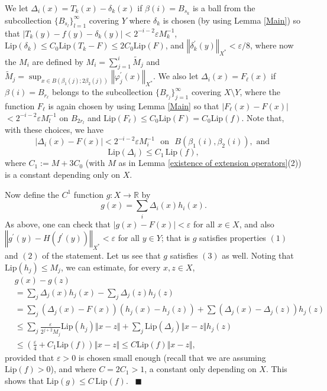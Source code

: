 \documentclass[11pt]{amsproc}%
\theoremstyle{plain}
\numberwithin{equation}{section}
\begin{document}
\noindent We let $\Delta_{i}\left(  x\right)  =T_{k}\left(  x\right)
-\delta_{k}\left(  x\right)  $ if $\beta(i)=B_{s_{k}}$ is a ball from the
subcollection $\{B_{s_{l}}\}_{l=1}^{\infty}$ covering $Y$ where $\delta_{k}$
is chosen (by using Lemma \ref{Main}) so that $\left\vert T_{k}\left(
y\right)  -f\left(  y\right)  -\delta_{k}\left(  y\right)  \right\vert
<2^{-i-2}\varepsilon M_{k}^{-1}$, $\textrm{Lip}(\delta_k)\leq C_0 \textrm{Lip}(T_k-F)\leq
2C_0\textrm{Lip}(F)$, and $\left\Vert \delta_{k}^{\prime}\left(
y\right)  \right\Vert _{X^{\ast}}<\varepsilon/8$, where now the
$M_{i}$ are
defined by $M_{i}=\sum_{j=1}^{i}\widetilde{M}_{j}$ and $\widetilde{M}_{j}%
=\sup_{x\in B(\beta_{1}(j);2\beta_{2}(j))}\left\Vert
\varphi_{j}^{\prime }\left(  x\right)  \right\Vert _{X^{\ast}}$.
We also let $\Delta _{i}(x)=F_{\ell}(x)$ if
$\beta(i)=B_{r_{\ell}}$ belongs to the subcollection
$\{B_{r_{j}}\}_{j=1}^{\infty}$ covering $X\setminus Y$, where the
function $F_{\ell}$ is again chosen by using Lemma \ref{Main} so
that $\left\vert F_{\ell}(x)-F(x)\right\vert$ $
<2^{-i-2}\varepsilon M_{l}^{-1}$ on $B_{2r_{l}}$ and
$\text{Lip}(F_{\ell})\leq C_{0}\text{Lip}(F)=C_{0}\text{Lip}(f)$.
Note that, with these choices, we have
\[
|\Delta_{i}(x)-F(x)|<2^{-i-2}\varepsilon M_{i}^{-1}\,\,\text{ on }%
\,\,B(\beta_{1}(i),\beta_{2}(i)),\text{ and }%
\]%
\[
\text{Lip}(\Delta_{i})\leq C_{1}\,\text{Lip}(f),
\]
where $C_{1}:=M+3C_0$ (with $M$ as in Lemma \ref{existence of
extension operators}(2)) is a constant depending only on $X$.

\medskip

\noindent Now define the $C^{1}$ function $g:X\rightarrow\mathbb{R}$ by
\[
g(x)=\sum_{i}\Delta_{i}(x)h_{i}(x).
\]
As above, one can check that $\left\vert g(x)-F(x)\right\vert <\varepsilon$
for all $x\in X$, and also $\left\Vert g^{\prime}(y)-H(f^{\prime
}(y))\right\Vert _{X^{\ast}}<\varepsilon$ for all $y\in Y$; that is $g$
satisfies properties $(1)$ and $(2)$ of the statement. Let us see that $g$
satisfies $(3)$ as well. Noting that $\text{Lip}(h_{j})\leq M_{j}$, we can
estimate, for every $x,z\in X$,
\begin{align*}
&  g(x)-g(z)\\
&  =\sum_{j}\Delta_{j}(x)h_{j}(x)-\sum_{j}\Delta_{j}(z)h_{j}(z)\\
&  =\sum_{j}(\Delta_{j}(x)-F(x))(h_{j}(x)-h_{j}(z))+\sum(\Delta_{j}%
(x)-\Delta_{j}(z))h_{j}(z)\\
&  \leq\sum_{j}\frac{\varepsilon}{2^{j+2}M_{j}}\text{Lip}(h_{j})\Vert
x-z\Vert+\sum_{j}\text{Lip}(\Delta_{j})\Vert x-z\Vert h_{j}\left(  z\right) \\
&  \leq\left(  \frac{\varepsilon}{4}+C_{1}\text{Lip}(f)\right)  \Vert
x-z\Vert\leq C\text{Lip}(f)\Vert x-z\Vert,
\end{align*}
provided that $\varepsilon>0$ is chosen small enough (recall that we are
assuming $\text{Lip}(f)>0$), and where $C=2C_{1}>1$, a constant only depending
on $X$. This shows that $\text{Lip}(g)\leq C\,\text{Lip}(f)$. \thinspace
\thinspace\ $\blacksquare$
\end{document}
